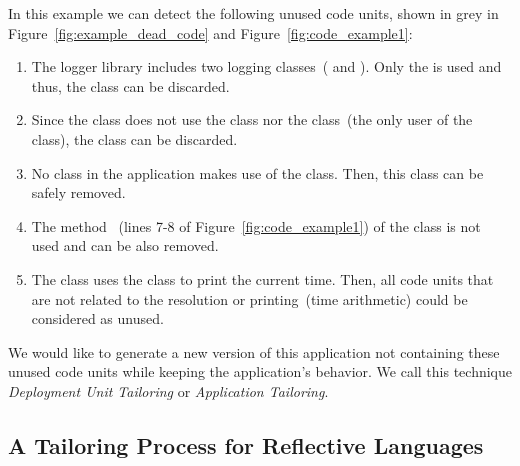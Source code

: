 In this example we can detect the following unused code units, shown in grey in Figure~\ref{fig:example_dead_code} and Figure~\ref{fig:code_example1}:
\begin{enumerate}
\item The logger library includes two logging classes~( and ). Only the  is used and thus, the  class can be discarded.
\item Since the  class does not use the  class nor the  class~(the only user of the  class), the  class can be discarded.
\item No class in the application makes use of the  class. Then, this class can be safely removed.
\item The method ~(lines 7-8 of Figure~\ref{fig:code_example1}) of the  class is not used and can be also removed.
\item The  class uses the  class to print the current time. Then, all code units that are not related to the  resolution or printing~(\ie time arithmetic) could be considered as unused.
\end{enumerate}

We would like to generate a new version of this application not containing these unused code units while keeping the application's behavior. We call this technique \emph{Deployment Unit Tailoring} or \emph{Application Tailoring}.

\subsection{A Tailoring Process for Reflective Languages}

